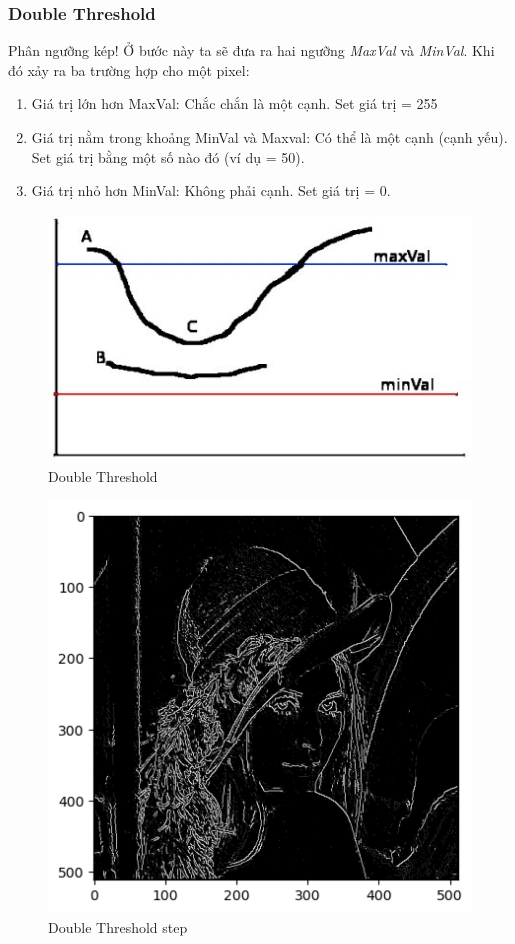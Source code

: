 \documentclass{article}
\begin{document}
    \subsubsection{Double Threshold}
    Phân ngưỡng kép! Ở bước này ta sẽ đưa ra hai ngưỡng \textit{MaxVal} và \textit{MinVal}. Khi đó xảy ra ba trường hợp cho một pixel:
    \begin{enumerate}
        \item Giá trị lớn hơn MaxVal: Chắc chắn là một cạnh. Set giá trị = 255
        \item Giá trị nằm trong khoảng MinVal và Maxval: Có thể là một cạnh (cạnh yếu). Set giá trị bằng một số nào đó (ví dụ = 50).
        \item Giá trị nhỏ hơn MinVal: Không phải cạnh. Set giá trị = 0.
    \end{enumerate}
    \begin{figure}[ht!]
        \centering
        \includegraphics[width = 0.7\linewidth]{fig11.jpg}
        \caption{Double Threshold}
        \label{fig12}
    \end{figure}
    \begin{figure}[ht!]
        \centering
        \includegraphics[width = 0.5\linewidth]{fig12.png}
        \caption{Double Threshold step}
        \label{fig13}
    \end{figure}
\end{document}
